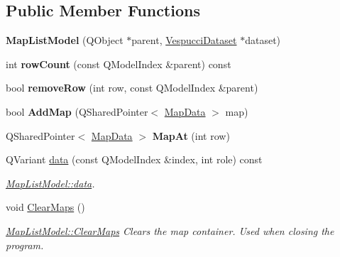 \subsection*{Public Member Functions}
\begin{DoxyCompactItemize}
\item 
\hypertarget{class_map_list_model_a8efdb956b03e7d40872a247f0f0031c5}{{\bfseries Map\+List\+Model} (Q\+Object $\ast$parent, \hyperlink{class_vespucci_dataset}{Vespucci\+Dataset} $\ast$dataset)}\label{class_map_list_model_a8efdb956b03e7d40872a247f0f0031c5}

\item 
\hypertarget{class_map_list_model_a109d6521ba8f2e40f07edd09e3e6fdcc}{int {\bfseries row\+Count} (const Q\+Model\+Index \&parent) const }\label{class_map_list_model_a109d6521ba8f2e40f07edd09e3e6fdcc}

\item 
\hypertarget{class_map_list_model_a67bc521b5f6aa669b4b62b1119573629}{bool {\bfseries remove\+Row} (int row, const Q\+Model\+Index \&parent)}\label{class_map_list_model_a67bc521b5f6aa669b4b62b1119573629}

\item 
\hypertarget{class_map_list_model_a44517a4200ce59ff5cfbf6a644c66005}{bool {\bfseries Add\+Map} (Q\+Shared\+Pointer$<$ \hyperlink{class_map_data}{Map\+Data} $>$ map)}\label{class_map_list_model_a44517a4200ce59ff5cfbf6a644c66005}

\item 
\hypertarget{class_map_list_model_a8620132016e5ae59ea1a60f08167a8d6}{Q\+Shared\+Pointer$<$ \hyperlink{class_map_data}{Map\+Data} $>$ {\bfseries Map\+At} (int row)}\label{class_map_list_model_a8620132016e5ae59ea1a60f08167a8d6}

\item 
Q\+Variant \hyperlink{class_map_list_model_a5052c6bc02674c253d497fa5c5a455d5}{data} (const Q\+Model\+Index \&index, int role) const 
\begin{DoxyCompactList}\small\item\em \hyperlink{class_map_list_model_a5052c6bc02674c253d497fa5c5a455d5}{Map\+List\+Model\+::data}. \end{DoxyCompactList}\item 
\hypertarget{class_map_list_model_a1acfd761a0d1efc2226f177f6b0dc039}{void \hyperlink{class_map_list_model_a1acfd761a0d1efc2226f177f6b0dc039}{Clear\+Maps} ()}\label{class_map_list_model_a1acfd761a0d1efc2226f177f6b0dc039}

\begin{DoxyCompactList}\small\item\em \hyperlink{class_map_list_model_a1acfd761a0d1efc2226f177f6b0dc039}{Map\+List\+Model\+::\+Clear\+Maps} Clears the map container. Used when closing the program. \end{DoxyCompactList}\end{DoxyCompactItemize}


